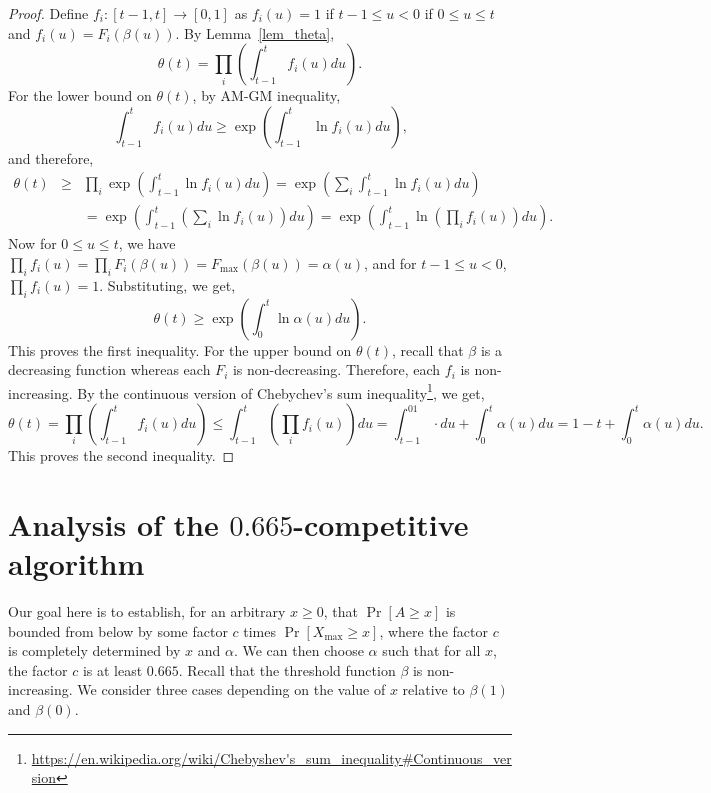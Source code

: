 \documentclass[10pt, letterpaper, twoside]{article}
\begin{document}
\begin{proof}
Define $f_i:[t-1,t]\longrightarrow[0,1]$ as $f_i(u)=1$ if $t-1\leq u<0$ if $0\leq u\leq t$ and $f_i(u)=F_i(\beta(u))$. By Lemma~\ref{lem_theta},
\[\theta(t)=\prod_i\left(\int_{t-1}^t f_i(u)du\right)\text{.}\]
For the lower bound on $\theta(t)$, by AM-GM inequality,
\[\int_{t-1}^tf_i(u)du\geq\exp\left(\int_{t-1}^t\ln f_i(u)du\right)\text{,}\]
and therefore,
\begin{eqnarray*}
\theta(t) & \geq & \prod_i\exp\left(\int_{t-1}^t\ln f_i(u)du\right)=\exp\left(\sum_i\int_{t-1}^t\ln f_i(u)du\right)\\
 & & =\exp\left(\int_{t-1}^t\left(\sum_i\ln f_i(u)\right)du\right)=\exp\left(\int_{t-1}^t\ln\left(\prod_i f_i(u)\right)du\right)\text{.}
\end{eqnarray*}
Now for $0\leq u\leq t$, we have $\prod_i f_i(u)=\prod_i F_i(\beta(u))=F_{\max}(\beta(u))=\alpha(u)$, and for $t-1\leq u<0$, $\prod_i f_i(u)=1$. Substituting, we get,
\[\theta(t)\geq\exp\left(\int_0^t\ln\alpha(u)du\right)\text{.}\]
This proves the first inequality. For the upper bound on $\theta(t)$, recall that $\beta$ is a decreasing function whereas each $F_i$ is non-decreasing. Therefore, each $f_i$ is non-increasing. By the continuous version of Chebychev's sum inequality\footnote{\url{https://en.wikipedia.org/wiki/Chebyshev's_sum_inequality\#Continuous_version}}, we get,
\[\theta(t)=\prod_i\left(\int_{t-1}^t f_i(u)du\right)\leq\int_{t-1}^t\left(\prod_if_i(u)\right)du=\int_{t-1}^01\cdot du+\int_0^t\alpha(u)du=1-t+\int_0^t\alpha(u)du\text{.}\]
This proves the second inequality.
\end{proof}


\section{Analysis of the $0.665$-competitive algorithm}

Our goal here is to establish, for an arbitrary $x\geq0$, that $\Pr[A\geq x]$ is bounded from below by some factor $c$ times $\Pr[X_{\max}\geq x]$, where the factor $c$ is completely determined by $x$ and $\alpha$. We can then choose $\alpha$ such that for all $x$, the factor $c$ is at least $0.665$. Recall that the threshold function $\beta$ is non-increasing. We consider three cases depending on the value of $x$ relative to $\beta(1)$ and $\beta(0)$. %
\end{document}
